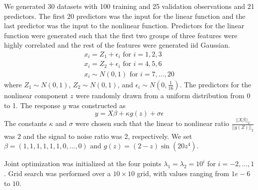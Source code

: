 \documentclass[10pt,letterpaper]{article}
\begin{document}
We generated 30 datasets with 100 training and 25 validation observations and 21 predictors. The first 20 predictors was the input for the linear function and the last predictor was the input to the nonlinear function. Predictors for the linear function were generated such that the first two groups of three features were highly correlated and the rest of the features were generated iid Gaussian.
\begin{equation}
\begin{array}{c}
x_i = Z_1 + \epsilon_i \text{ for } i=1, 2, 3 \\
x_i = Z_2 + \epsilon_i \text{ for } i= 4, 5, 6 \\
x_i \sim N(0,1) \text{ for } i = 7, ..., 20
\end{array}
\end{equation}
where $Z_1 \sim N(0,1)$, $Z_2 \sim N(0,1)$, and $\epsilon_i \sim N(0, \frac{1}{16})$. The predictors for the nonlinear component $z$ were randomly drawn from a uniform distribution from 0 to 1. The response $y$ was constructed as
\begin{equation}
y = X\beta + \kappa g(z) + \sigma \epsilon
\end{equation}
The constants $\kappa$ and $\sigma$ were chosen such that the linear to nonlinear ratio $\frac{||X\beta||_2}{||g(Z)||_2}$ was 2 and the signal to noise ratio was 2, respectively. We set $\beta = (1, 1, 1, 1, 1, 1, 0, ..., 0)$ and $g(z) =(2-z)\sin(20z^4)$.

Joint optimization was initialized at the four points $\lambda_1 = \lambda_2 = 10^i$ for $i=-2, ..., 1$. Grid search was performed over a $10 \times 10$ grid, with values ranging from $1e-6$ to $10$.
\end{document}

